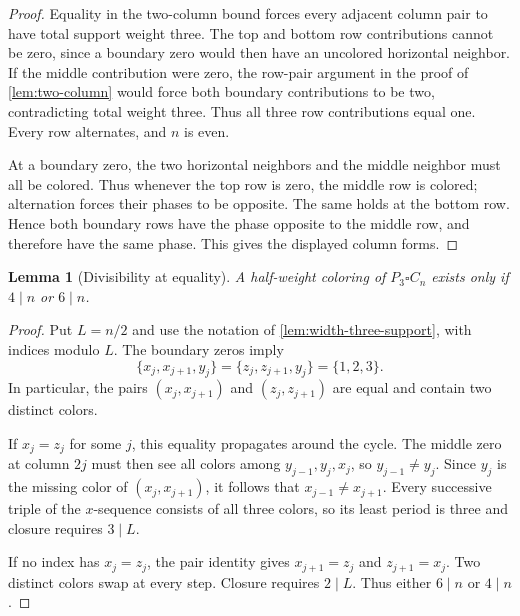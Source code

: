 \documentclass[11pt]{article}
\newtheorem{lemma}[theorem]{Lemma}
\theoremstyle{definition}
\theoremstyle{remark}
\begin{document}
\begin{proof}
Equality in the two-column bound forces every adjacent column pair to have total support weight three. The top and bottom row contributions cannot be zero, since a boundary zero would then have an uncolored horizontal neighbor. If the middle contribution were zero, the row-pair argument in the proof of \cref{lem:two-column} would force both boundary contributions to be two, contradicting total weight three. Thus all three row contributions equal one. Every row alternates, and $n$ is even.

At a boundary zero, the two horizontal neighbors and the middle neighbor must all be colored. Thus whenever the top row is zero, the middle row is colored; alternation forces their phases to be opposite. The same holds at the bottom row. Hence both boundary rows have the phase opposite to the middle row, and therefore have the same phase. This gives the displayed column forms.
\end{proof}

\begin{lemma}[Divisibility at equality]\label{lem:width-three-divisibility}
A half-weight coloring of $P_3\square C_n$ exists only if $4\mid n$ or $6\mid n$.
\end{lemma}

\begin{proof}
Put $L=n/2$ and use the notation of \cref{lem:width-three-support}, with indices modulo $L$. The boundary zeros imply
\[
 \{x_j,x_{j+1},y_j\}=\{z_j,z_{j+1},y_j\}=\{1,2,3\}.
\]
In particular, the pairs $(x_j,x_{j+1})$ and $(z_j,z_{j+1})$ are equal and contain two distinct colors.

If $x_j=z_j$ for some $j$, this equality propagates around the cycle. The middle zero at column $2j$ must then see all colors among $y_{j-1},y_j,x_j$, so $y_{j-1}\neq y_j$. Since $y_j$ is the missing color of $(x_j,x_{j+1})$, it follows that $x_{j-1}\neq x_{j+1}$. Every successive triple of the $x$-sequence consists of all three colors, so its least period is three and closure requires $3\mid L$.

If no index has $x_j=z_j$, the pair identity gives $x_{j+1}=z_j$ and $z_{j+1}=x_j$. Two distinct colors swap at every step. Closure requires $2\mid L$. Thus either $6\mid n$ or $4\mid n$.
\end{proof}
\end{document}

